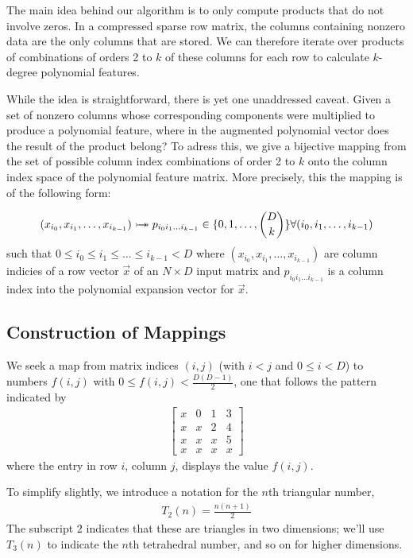 \documentclass{article} %
\begin{document}
The main idea behind our algorithm is to only compute products that do not involve zeros.
In a compressed sparse row matrix, the columns containing nonzero data are the only columns that are stored.
We can therefore iterate over products of combinations of orders 2 to $k$ of these columns for each row to calculate $k$-degree polynomial features.

While the idea is straightforward, there is yet one unaddressed caveat.
Given a set of nonzero columns whose corresponding components were multiplied to produce a polynomial feature, where in the augmented polynomial vector does the result of the product belong?
To adress this, we give a bijective mapping from the set of possible column index combinations of order 2 to $k$ onto the column index space of the polynomial feature matrix.
More precisely, this the mapping is of the following form:

\begin{equation}
(x_{i_0}, x_{i_1}, \dots, x_{i_{k-1}}) \rightarrowtail \hspace{-1.9ex} \twoheadrightarrow p_{i_0i_1 \dots i_{k-1}} \in \{0,1,\dots, \binom{D}{k}\} 
\forall (i_0, i_1, \dots, i_{k-1})
\end{equation}
such that $ 0 \le i_0 \le i_1 \le \dots \le i_{k-1} < D$
where $(x_{i_0}, x_{i_1}, \dots, x_{i_{k-1}})$ are column indicies of a row vector $\vec{x}$ of an $N \times D$ input matrix and $p_{i_0i_1 \dots i_{k-1}}$ is a column index into the polynomial expansion vector for $\vec{x}$.

\subsection{Construction of Mappings}

We seek a map from matrix indices $(i, j)$ (with $i < j$ and $0 \le i < D$) to numbers $f(i, j)$ with $0 \le f(i, j) < \frac{D(D-1)}{2}$, one that follows the pattern indicated by 
\begin{align}
\begin{bmatrix}
x & 0 & 1 & 3 \\
x & x & 2 & 4 \\
x & x & x & 5 \\
x & x & x & x
\end{bmatrix}
\label{eq:4x4mat}
\end{align}
where the entry in row $i$, column $j$, displays the value $f(i, j)$. 

To simplify slightly, we introduce a notation for the $n$th triangular number, 
\begin{align}
T_2(n) = \frac{n(n+1)}{2}
\end{align}
\noindent
The subscript $2$ indicates that these are triangles in two dimensions; we'll use $T_3(n)$ to indicate the $n$th tetrahedral number, and so on for higher dimensions. 
\end{document}
